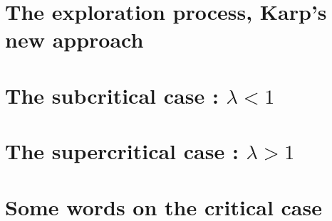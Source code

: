 \section{The exploration process, Karp's new approach}
\section{The subcritical case : $\lambda < 1 $ }
\section{The supercritical case : $\lambda > 1 $ }
\section{Some words on the critical case}
